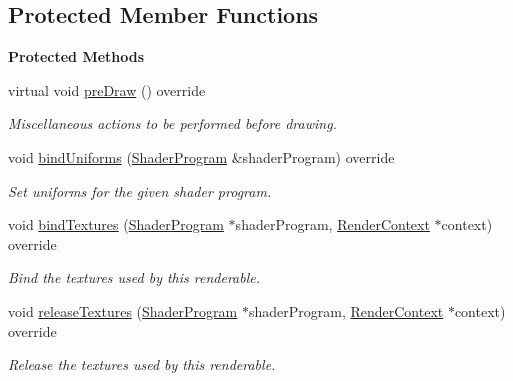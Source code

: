 \subsection*{Protected Member Functions}
\begin{Indent}\textbf{ Protected Methods}\par
\begin{DoxyCompactItemize}
\item 
virtual void \mbox{\hyperlink{classrev_1_1_model_chunk_a59831075966c33b791a59ab6a5f29937}{pre\+Draw}} () override
\begin{DoxyCompactList}\small\item\em Miscellaneous actions to be performed before drawing. \end{DoxyCompactList}\item 
void \mbox{\hyperlink{classrev_1_1_model_chunk_a57d245e346f01286e07f87fe3e409495}{bind\+Uniforms}} (\mbox{\hyperlink{classrev_1_1_shader_program}{Shader\+Program}} \&shader\+Program) override
\begin{DoxyCompactList}\small\item\em Set uniforms for the given shader program. \end{DoxyCompactList}\item 
\mbox{\label{classrev_1_1_model_chunk_a8e375c0783e6933bdcf228a30fa7a310}} 
void \mbox{\hyperlink{classrev_1_1_model_chunk_a8e375c0783e6933bdcf228a30fa7a310}{bind\+Textures}} (\mbox{\hyperlink{classrev_1_1_shader_program}{Shader\+Program}} $\ast$shader\+Program, \mbox{\hyperlink{classrev_1_1_render_context}{Render\+Context}} $\ast$context) override
\begin{DoxyCompactList}\small\item\em Bind the textures used by this renderable. \end{DoxyCompactList}\item 
\mbox{\label{classrev_1_1_model_chunk_a30fb5bac24e02bb63f84a3d6a306a78b}} 
void \mbox{\hyperlink{classrev_1_1_model_chunk_a30fb5bac24e02bb63f84a3d6a306a78b}{release\+Textures}} (\mbox{\hyperlink{classrev_1_1_shader_program}{Shader\+Program}} $\ast$shader\+Program, \mbox{\hyperlink{classrev_1_1_render_context}{Render\+Context}} $\ast$context) override
\begin{DoxyCompactList}\small\item\em Release the textures used by this renderable. \end{DoxyCompactList}\item 

\end{DoxyCompactItemize}
\end{Indent}
